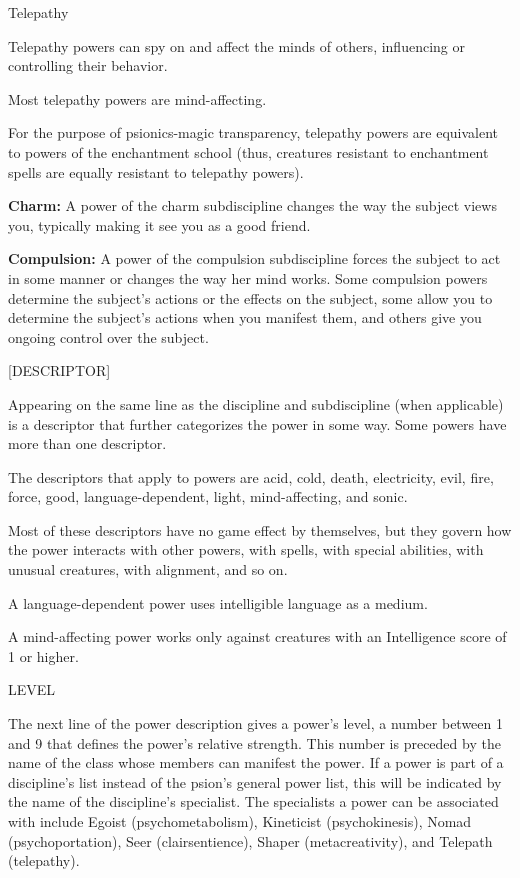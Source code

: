 \documentclass{article}
\begin{document}
\vspace{12pt}
Telepathy

Telepathy powers can spy on and affect the minds of others, influencing or controlling 
their behavior.

Most telepathy powers are mind-affecting.

For the purpose of psionics-magic transparency, telepathy powers are equivalent 
to powers of the enchantment school (thus, creatures resistant to enchantment spells 
are equally resistant to telepathy powers).

\textbf{Charm:} A power of the charm subdiscipline changes the way the subject 
views you, typically making it see you as a good friend.

\textbf{Compulsion:} A power of the compulsion subdiscipline forces the subject 
to act in some manner or changes the way her mind works. Some compulsion powers 
determine the subject's actions or the effects on the subject, some allow you to 
determine the subject's actions when you manifest them, and others give you ongoing 
control over the subject.

\vspace{12pt}
[DESCRIPTOR]

Appearing on the same line as the discipline and subdiscipline (when applicable) 
is a descriptor that further categorizes the power in some way. Some powers have 
more than one descriptor.

The descriptors that apply to powers are acid, cold, death, electricity, evil, 
fire, force, good, language-dependent, light, mind-affecting, and sonic.

Most of these descriptors have no game effect by themselves, but they govern how 
the power interacts with other powers, with spells, with special abilities, with 
unusual creatures, with alignment, and so on.

A language-dependent power uses intelligible language as a medium. 

A mind-affecting power works only against creatures with an Intelligence score 
of 1 or higher.

\vspace{12pt}
LEVEL

The next line of the power description gives a power's level, a number between 
1 and 9 that defines the power's relative strength. This number is preceded by 
the name of the class whose members can manifest the power. If a power is part 
of a discipline's list instead of the psion's general power list, this will be 
indicated by the name of the discipline's specialist. The specialists a power can 
be associated with include Egoist (psychometabolism), Kineticist (psychokinesis), 
Nomad (psychoportation), Seer (clairsentience), Shaper (metacreativity), and Telepath 
(telepathy). 
\end{document}
